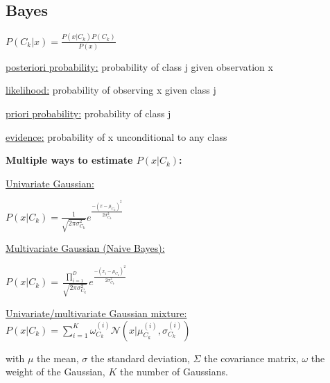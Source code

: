 \subsection*{Bayes}
$P(C_k|x) = \frac{P(x|C_k)P(C_k)}{P(x)}$

\underline{posteriori probability:} probability of class j given observation x

\underline{likelihood:} probability of observing x given class j

\underline{priori probability:} probability of class j

\underline{evidence:} probability of x unconditional to any class

\textbf{Multiple ways to estimate $P(x|C_k)$:}

\underline{Univariate Gaussian:}

$P(x|C_k) = \frac{1}{\sqrt{2\pi\sigma_{C_k}^2}}e^{\frac{-(x-\mu_{C_k})^2}{2\sigma_{C_k}^2}}$

\underline{Multivariate Gaussian (Naive Bayes):}

$P(x|C_k) = \frac{\prod_{i=1}^{D}}{\sqrt{2\pi\sigma_{C_k}^2}}e^{\frac{-(x_i-\mu_{C_k})^2}{2\sigma_{C_k}^2}}$

\underline{Univariate/multivariate Gaussian mixture:}
$P(x|C_k) = \sum_{i=1}^{K}\omega_{C_k}^{(i)}\mathcal{N}(x|\mu_{C_k}^{(i)}, \sigma_{C_k}^{(i)})$

with $\mu$ the mean, $\sigma$ the standard deviation, $\Sigma$ the covariance matrix,
$\omega$ the weight of the Gaussian, $K$ the number of Gaussians.
